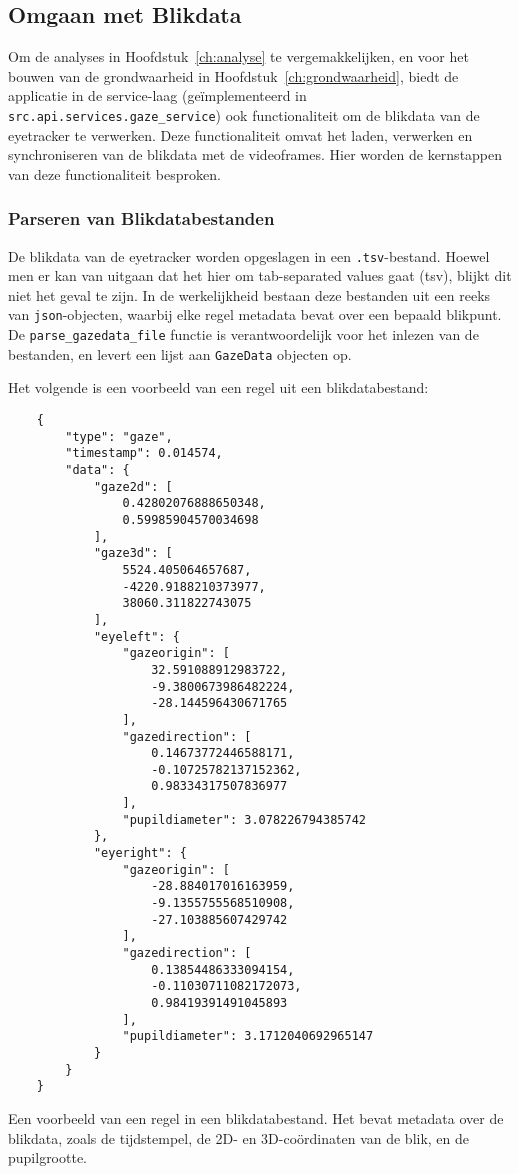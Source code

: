 \subsection{Omgaan met Blikdata}
\label{sec:omgaan-met-blikdata}

Om de analyses in Hoofdstuk~\ref{ch:analyse} te vergemakkelijken, en voor het bouwen van de grondwaarheid in Hoofdstuk~\ref{ch:grondwaarheid}, biedt de applicatie 
in de service-laag (geïmplementeerd in \texttt{src.api.services.gaze\_service}) ook functionaliteit om de blikdata van de eyetracker te verwerken.
Deze functionaliteit omvat het laden, verwerken en synchroniseren van de blikdata met de videoframes.
Hier worden de kernstappen van deze functionaliteit besproken.

\subsubsection{Parseren van Blikdatabestanden}

De blikdata van de eyetracker worden opgeslagen in een \texttt{.tsv}-bestand.
Hoewel men er kan van uitgaan dat het hier om tab-separated values gaat (tsv), blijkt dit niet het geval te zijn.
In de werkelijkheid bestaan deze bestanden uit een reeks van \texttt{json}-objecten, waarbij elke regel metadata bevat over een bepaald blikpunt.
De \texttt{parse\_gazedata\_file} functie is verantwoordelijk voor het inlezen van de bestanden, 
en levert een lijst aan \texttt{GazeData} objecten op.

Het volgende is een voorbeeld van een regel uit een blikdatabestand:
\begin{listing}[H]
  \begin{verbatim}
    {
        "type": "gaze",
        "timestamp": 0.014574,
        "data": {
            "gaze2d": [
                0.42802076888650348,
                0.59985904570034698
            ],
            "gaze3d": [
                5524.405064657687,
                -4220.9188210373977,
                38060.311822743075
            ],
            "eyeleft": {
                "gazeorigin": [
                    32.591088912983722,
                    -9.3800673986482224,
                    -28.144596430671765
                ],
                "gazedirection": [
                    0.14673772446588171,
                    -0.10725782137152362,
                    0.98334317507836977
                ],
                "pupildiameter": 3.078226794385742
            },
            "eyeright": {
                "gazeorigin": [
                    -28.884017016163959,
                    -9.1355755568510908,
                    -27.103885607429742
                ],
                "gazedirection": [
                    0.13854486333094154,
                    -0.11030711082172073,
                    0.98419391491045893
                ],
                "pupildiameter": 3.1712040692965147
            }
        }
    }
  \end{verbatim}
  \caption[Voorbeeld van een regel in een blikdatabestand]{
    Een voorbeeld van een regel in een blikdatabestand. 
    Het bevat metadata over de blikdata, zoals de tijdstempel, de 2D- en 3D-coördinaten van de blik, en de pupilgrootte.
  }
\end{listing}

